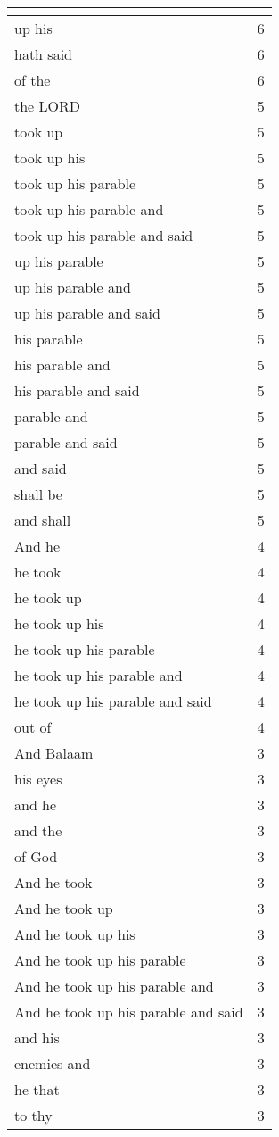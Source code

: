 \begin{center}
\begin{longtable}{|p{3.0in}|p{0.5in}|}
\hline \multicolumn{2}{c}{{ }} \\ \hline
\endfoot 
up his & 6\\ \hline 
hath said & 6\\ \hline 
of the & 6\\ \hline 
the LORD & 5\\ \hline 
took up & 5\\ \hline 
took up his & 5\\ \hline 
took up his parable & 5\\ \hline 
took up his parable and & 5\\ \hline 
took up his parable and said & 5\\ \hline 
up his parable & 5\\ \hline 
up his parable and & 5\\ \hline 
up his parable and said & 5\\ \hline 
his parable & 5\\ \hline 
his parable and & 5\\ \hline 
his parable and said & 5\\ \hline 
parable and & 5\\ \hline 
parable and said & 5\\ \hline 
and said & 5\\ \hline 
shall be & 5\\ \hline 
and shall & 5\\ \hline 
And he & 4\\ \hline 
he took & 4\\ \hline 
he took up & 4\\ \hline 
he took up his & 4\\ \hline 
he took up his parable & 4\\ \hline 
he took up his parable and & 4\\ \hline 
he took up his parable and said & 4\\ \hline 
out of & 4\\ \hline 
And Balaam & 3\\ \hline 
his eyes & 3\\ \hline 
and he & 3\\ \hline 
and the & 3\\ \hline 
of God & 3\\ \hline 
And he took & 3\\ \hline 
And he took up & 3\\ \hline 
And he took up his & 3\\ \hline 
And he took up his parable & 3\\ \hline 
And he took up his parable and & 3\\ \hline 
And he took up his parable and said & 3\\ \hline 
and his & 3\\ \hline 
enemies and & 3\\ \hline 
he that & 3\\ \hline 
to thy & 3\\ \hline 
\end{longtable}
\end{center}





